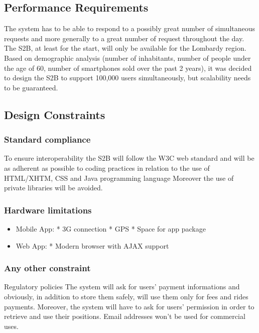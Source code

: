 \subsection{Performance Requirements}
The system has to be able to respond to a possibly great number of simultaneous requests and
more generally to a great number of request throughout the day.
The S2B, at least for the start, will only be available for the Lombardy region. Based on demographic analysis (number of inhabitants, number of people under the age of 60, number of smartphones sold over the past 2 years), it was decided to design the S2B to support 100,000 users simultaneously, but scalability needs to be guaranteed.
\subsection{Design Constraints}
	\subsubsection{Standard compliance}
	To ensure interoperability the S2B will follow the W3C web standard and will be as adherent as possible to  coding practices in relation to the use of HTML/XHTM, CSS and Java programming language
	Moreover the use of private libraries will be avoided.
	\subsubsection{Hardware limitations}
		\begin{itemize}
		\item Mobile App: \newline
		* 3G connection\newline
		* GPS\newline
		* Space for app package
		\item Web App:\newline
		* Modern browser with AJAX support
		\end{itemize}
	
	\subsubsection{Any other constraint}
	Regulatory policies
	The system will ask for users' payment informations and obviously, in addition to store them
	safely, will use them only for fees and rides payments.
	Moreover, the system will have to ask for users' permission in order to retrieve and use their
	positions.
	Email addresses won't be used for commercial uses.
